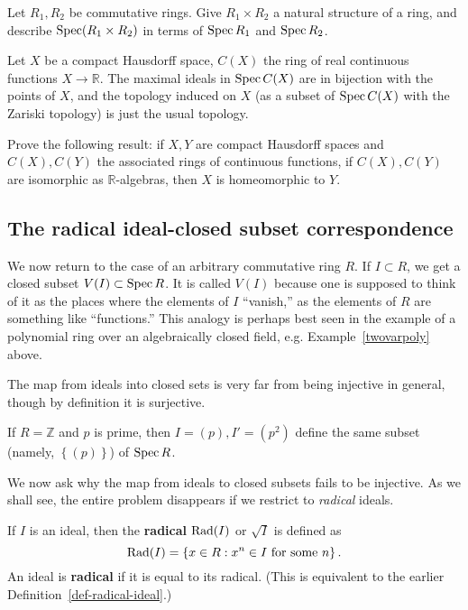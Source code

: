\begin{exercise} 
Let $R_1, R_2$ be commutative rings. Give $R_1 \times R_2$ a
natural structure
of a ring, and describe $\operatorname{Spec}( R_1 \times R_2)$ in terms of
$\operatorname{Spec} R_1$ and
$\operatorname{Spec} R_2$.
\end{exercise} 


\begin{exercise} 
Let $X$ be a compact Hausdorff space, $C(X)$ the ring of real
continuous
functions $X \to \mathbb{R}$. 
The maximal ideals in $\operatorname{Spec} C(X)$ are in bijection with the
points of $X$,
and the topology induced on $X $ (as a subset of $\operatorname{Spec} C(X)$ with the Zariski
topology)
is just the usual topology.
\end{exercise}

\begin{exercise}
Prove the following result: if $X, Y$ are compact Hausdorff
spaces and $C(X),
C(Y)$ the associated rings of continuous functions, if $C(X),
C(Y)$ are
isomorphic as $\mathbb{R}$-algebras, then $X$ is homeomorphic to
$Y$.
\end{exercise} 


\subsection{The radical ideal-closed subset correspondence}

We now return to the case of an arbitrary commutative ring $R$.
If $I \subset R$, we get a closed
subset $V(I) \subset \operatorname{Spec} R$. It is called $V(I)$ because one
is supposed to
think of it as the places where the elements of $I$ ``vanish,''
as the
elements of $R$ are something like ``functions.'' This analogy
is perhaps best
seen in the example of a polynomial ring over an algebraically
closed field,
e.g. Example~\ref{twovarpoly} above.

The map from ideals into closed sets is very far from being
injective in
general, though by definition it is surjective.

\begin{example} 
If $R = \mathbb{Z}$ and $p$ is prime, then $I = (p), I' = (p^2)$
define the
same subset (namely, $\left\{(p)\right\}$) of
$\operatorname{Spec} R$. 
\end{example} 

We now ask why the map from ideals to closed
subsets fails to
be injective. As we shall see, the entire problem disappears if
we restrict to
\emph{radical} ideals.

\begin{definition} 
If $I$ is an ideal, then the \textbf{radical} $\operatorname{Rad}(I) $ or $
\sqrt{I}$ is
defined as $$\operatorname{Rad}(I) =
\left\{x \in R: x^n \in I \ \mathrm{for} \ \mathrm{some} \ n
\right\}.$$
An ideal is \textbf{radical} if it is equal to its radical.
(This is
equivalent to the earlier Definition~\ref{def-radical-ideal}.) 
\end{definition} 

